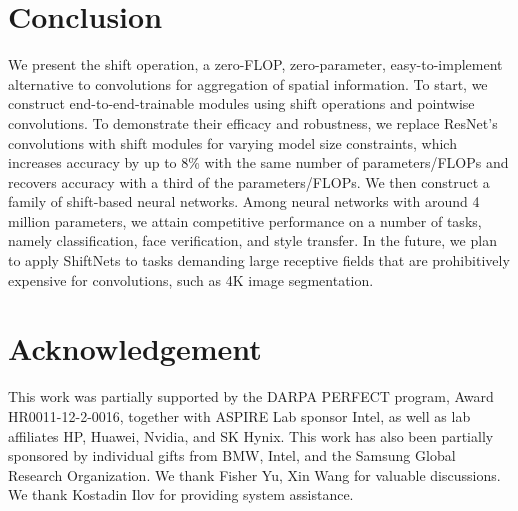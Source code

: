 \documentclass[10pt,twocolumn,letterpaper]{article}
\begin{document}
\section{Conclusion}
We present the shift operation, a zero-FLOP, zero-parameter, easy-to-implement alternative to convolutions for aggregation of spatial information. To start, we construct end-to-end-trainable modules using shift operations and pointwise convolutions. To demonstrate their efficacy and robustness, we replace ResNet's convolutions with shift modules for varying model size constraints, which increases accuracy by up to 8\% with the same number of parameters/FLOPs and recovers accuracy with a third of the parameters/FLOPs. We then construct a family of shift-based neural networks. Among neural networks with around 4 million parameters, we attain competitive performance on a number of tasks, namely classification, face verification, and style transfer. In the future, we plan to apply ShiftNets to tasks demanding large receptive fields that are  prohibitively expensive for convolutions, such as 4K image segmentation.

\section*{Acknowledgement}
This work was partially supported by the DARPA PERFECT program, Award HR0011-12-2-0016, together with ASPIRE Lab sponsor Intel, as well as lab affiliates HP, Huawei, Nvidia, and SK Hynix. This work has also been partially sponsored by individual gifts from BMW, Intel, and the Samsung Global Research Organization. We thank Fisher Yu, Xin Wang for valuable discussions. We thank Kostadin Ilov for providing system assistance. 








\pagebreak{\small


}
\end{document}
